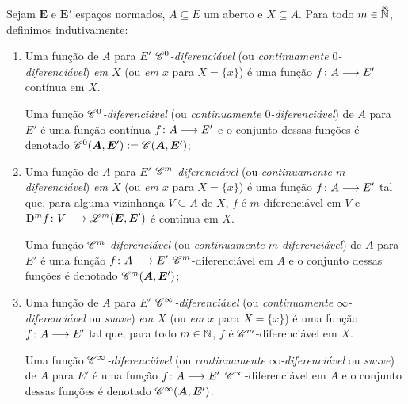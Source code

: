 \begin{comment}
	Uma função \emph{$\Cont^\infty$-diferenciável} (ou \emph{continuamente $\infty$-diferenciável} ou \emph{suave}) de $A$ para $E'$ é uma função $\fun{f}{A}{E'}$ $\Cont^{\infty}$-diferenciável em $A$ e o conjunto dessas funções é denotado $\Cont^\infty(\bm A,\bm E')$.
	\end{enumerate}
\end{definition}
\end{comment}

\begin{definition}
Sejam $\bm E$ e $\bm E'$ espaços normados, $A \subseteq E$ um aberto e $X \subseteq A$. Para todo $m \in \accentset{\infty}{\mathbb{N}}$, definimos indutivamente:
	\begin{enumerate}
	\item Uma função de $A$ para $E'$ \emph{$\mathscr{C}^0$-diferenciável} (ou \emph{continuamente $0$-diferenciável}) \emph{em $X$} (ou \emph{em $x$} para $X = \{x\}$) é uma função ${f}\colon {A} \longrightarrow {E'}$ contínua em $X$.

	Uma função \emph{$\mathscr{C}^0$-diferenciável} (ou \emph{continuamente $0$-diferenciável}) de $A$ para $E'$ é uma função contínua ${f}\colon {A} \longrightarrow {E'}$ e o conjunto dessas funções é denotado $\mathscr{C}^0(\bm A,\bm E') := \mathscr{C}(\bm A,\bm E')$;

	\item Uma função de $A$ para $E'$ \emph{$\mathscr{C}^m$-diferenciável} (ou \emph{continuamente $m$-diferenciável}) \emph{em $X$} (ou \emph{em $x$} para $X = \{x\}$) é uma função ${f}\colon {A} \longrightarrow {E'}$ tal que, para alguma vizinhança $V \subseteq A$ de $X$, $f$ é $m$-diferenciável em $V$ e %
	${\mathrm{D}^m f}\colon {V} \longrightarrow {\mathscr{L}^m(\bm E, \bm E')}$ é contínua em $X$.

	Uma função \emph{$\mathscr{C}^m$-diferenciável} (ou \emph{continuamente $m$-diferenciável}) de $A$ para $E'$ é uma função ${f}\colon {A} \longrightarrow {E'}$ $\mathscr{C}^m$-diferenciável em $A$ e o conjunto dessas funções é denotado $\mathscr{C}^m(\bm A,\bm E')$;

	\item Uma função de $A$ para $E'$ \emph{$\mathscr{C}^\infty$-diferenciável} (ou \emph{continuamente $\infty$-diferenciável} ou \emph{suave}) \emph{em $X$} (ou \emph{em $x$} para $X = \{x\}$) é uma função ${f}\colon {A} \longrightarrow {E'}$ tal que, para todo $m \in \mathbb{N}$, $f$ é $\mathscr{C}^{m}$-diferenciável em $X$.

	Uma função \emph{$\mathscr{C}^\infty$-diferenciável} (ou \emph{continuamente $\infty$-diferenciável} ou \emph{suave}) de $A$ para $E'$ é uma função ${f}\colon {A} \longrightarrow {E'}$ $\mathscr{C}^{\infty}$-diferenciável em $A$ e o conjunto dessas funções é denotado $\mathscr{C}^\infty(\bm A,\bm E')$.
	\end{enumerate}
\end{definition}

